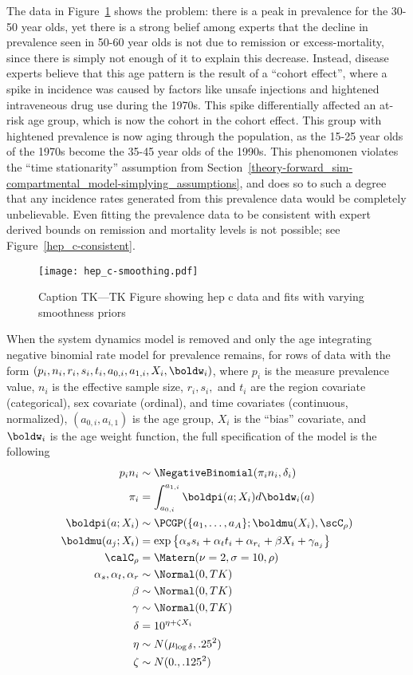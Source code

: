 The data in Figure~\ref{hep_c-data} shows the problem: there is a peak
in prevalence for the 30-50 year olds, yet there is a strong belief
among experts that the decline in prevalence seen in 50-60 year olds
is not due to remission or excess-mortality, since there is simply not
enough of it to explain this decrease.  Instead, disease experts
believe that this age pattern is the result of a ``cohort effect'',
where a spike in incidence was caused by factors like unsafe
injections and hightened intraveneous drug use during the 1970s.  This
spike differentially affected an at-risk age group, which is now the
cohort in the cohort effect.  This group with hightened prevalence is
now aging through the population, as the 15-25 year olds of the 1970s
become the 35-45 year olds of the 1990s.  This phenomonen violates the
``time stationarity'' assumption from
Section~\ref{theory-forward_sim-compartmental_model-simplying_assumptions},
and does so to such a degree that any incidence rates generated from
this prevalence data would be completely unbelievable.  Even fitting
the prevalence data to be consistent with expert derived bounds on
remission and mortality levels is not possible; see
Figure~\ref{hep_c-consistent}.
\begin{figure}
\begin{center}
\texttt{[image: hep\_c-smoothing.pdf]}
\end{center}
\caption{Caption TK---TK Figure showing hep c data and fits with varying smoothness priors}
\label{hep_c-data}
\end{figure}

When the system dynamics model is removed and only the age integrating
negative binomial rate model for prevalence remains, for rows of data
with the form $(p_i, n_i, r_i, s_i, t_i, a_{0,i}, a_{1,i}, X_i,
\boldw_i)$, where $p_i$ is the measure prevalence value, $n_i$ is the
effective sample size, $r_i, s_i,$ and $t_i$ are the region covariate
(categorical), sex covariate (ordinal), and time covariates
(continuous, normalized), $(a_{0,i}, a_{i,1})$ is the age group, $X_i$
is the ``bias'' covariate, and $\boldw_i$ is the age weight function,
the full specification of the model is the following
\begin{align*}
p_i n_i &\sim \NegativeBinomial(\pi_i n_i, \delta_i)\\
\pi_i &= \int_{a_{0,i}}^{a_{1,i}} \boldpi(a; X_i)d\boldw_i(a)\\
\boldpi(a; X_i) &\sim \PCGP(\{a_1, \ldots, a_A\}; \boldmu(X_i), \scC_\rho)\\
\boldmu(a_j; X_i) &= \exp\left\{\alpha_s s_i + \alpha_t t_i + \alpha_{r_i} +
\beta X_i + \gamma_{a_j}\right\}\\
\calC_\rho &= \Matern(\nu=2, \sigma=10, \rho)\\
\alpha_s, \alpha_t, \alpha_r &\sim \Normal(0, TK)\\
\beta &\sim \Normal(0, TK)\\
\gamma &\sim \Normal(0, TK)\\
\delta &= 10^{\eta + \zeta X_i}\\
\eta &\sim N(\mu_{\log \delta}, .25^2)\\
\zeta &\sim N(0., .125^2)
\end{align*}

